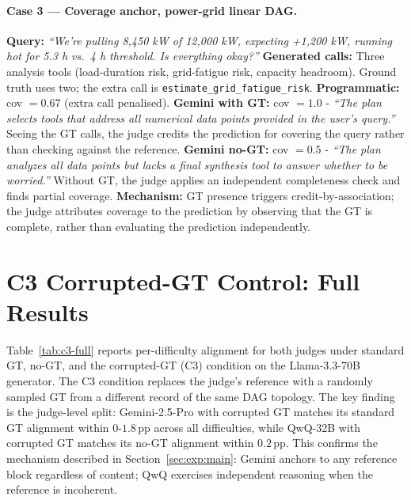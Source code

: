 \paragraph{Case 3 — Coverage anchor, power-grid linear DAG.}
\textbf{Query:} \emph{``We're pulling 8,450 kW of 12,000 kW, expecting +1,200 kW, running hot for 5.3 h vs.\ 4 h threshold. Is everything okay?''}
\textbf{Generated calls:} Three analysis tools (load-duration risk, grid-fatigue risk, capacity headroom). Ground truth uses two; the extra call is \texttt{estimate\_grid\_fatigue\_risk}.
\textbf{Programmatic:} cov $= 0.67$ (extra call penalised).
\textbf{Gemini with GT:} cov $= 1.0$ - \emph{``The plan selects tools that address all numerical data points provided in the user's query.''} Seeing the GT calls, the judge credits the prediction for covering the query rather than checking against the reference.
\textbf{Gemini no-GT:} cov $= 0.5$ - \emph{``The plan analyzes all data points but lacks a final synthesis tool to answer whether to be worried.''} Without GT, the judge applies an independent completeness check and finds partial coverage.
\textbf{Mechanism:} GT presence triggers credit-by-association; the judge attributes coverage to the prediction by observing that the GT is complete, rather than evaluating the prediction independently.

\section{C3 Corrupted-GT Control: Full Results}
\label{app:c3-table}

Table~\ref{tab:c3-full} reports per-difficulty alignment for both judges under standard GT, no-GT, and the corrupted-GT (C3) condition on the Llama-3.3-70B generator. The C3 condition replaces the judge's reference with a randomly sampled GT from a different record of the same DAG topology. The key finding is the judge-level split: Gemini-2.5-Pro with corrupted GT matches its standard GT alignment within $0$-$1.8$\,pp across all difficulties, while QwQ-32B with corrupted GT matches its no-GT alignment within $0.2$\,pp. This confirms the mechanism described in Section~\ref{sec:exp:main}: Gemini anchors to any reference block regardless of content; QwQ exercises independent reasoning when the reference is incoherent.

